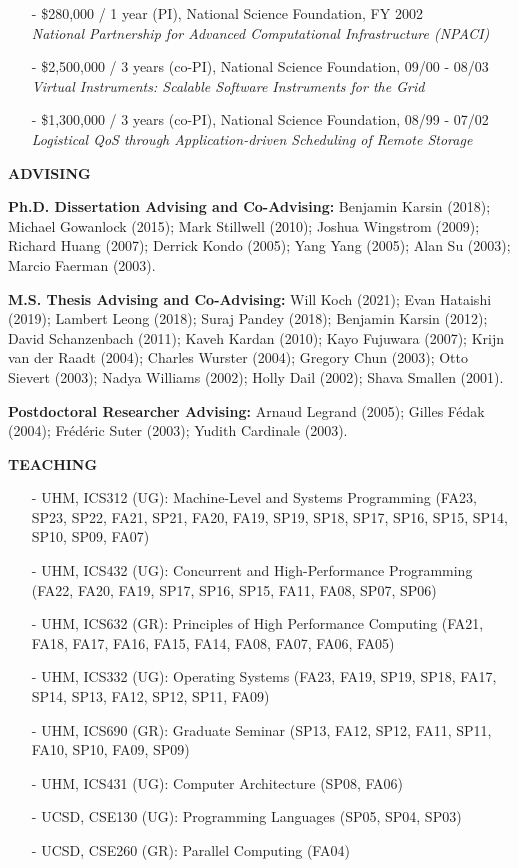 \documentclass[times,11pt]{letter}
\begin{document}
\begin{itemize}
\item[-] \$280,000 / 1 year (PI), National Science Foundation, FY 2002~\\
      \emph{National Partnership for Advanced Computational Infrastructure (NPACI)}

\item[-] \$2,500,000 / 3 years (co-PI), National Science Foundation, 09/00 - 08/03~\\
{\it Virtual Instruments: Scalable Software Instruments for the Grid}

\item[-] \$1,300,000 / 3 years (co-PI), National Science Foundation, 08/99 - 07/02~\\
{\it Logistical QoS through Application-driven Scheduling of Remote Storage}

\end{itemize}

\noindent
{\large{\bf ADVISING}}


\noindent
{\bf Ph.D. Dissertation Advising and Co-Advising:}
 Benjamin Karsin (2018); 
 Michael Gowanlock (2015);
 Mark Stillwell (2010); 
 Joshua Wingstrom (2009);
 Richard Huang (2007); 
 Derrick Kondo (2005);
 Yang Yang (2005);
 Alan Su (2003);
 Marcio Faerman (2003).

\noindent
{\bf M.S. Thesis Advising and Co-Advising:}
 Will Koch (2021);
 Evan Hataishi (2019);
 Lambert Leong (2018);
 Suraj Pandey (2018);
 Benjamin Karsin (2012);
 David Schanzenbach (2011);
 Kaveh Kardan (2010);
 Kayo Fujuwara (2007);
 Krijn van der Raadt (2004);
 Charles Wurster (2004);
 Gregory Chun (2003);
 Otto Sievert (2003);
 Nadya Williams (2002);
 Holly Dail (2002);
 Shava Smallen (2001).

\noindent
{\bf Postdoctoral Researcher Advising:}
 Arnaud Legrand (2005);
 Gilles F\'edak (2004);
 Fr\'ed\'eric Suter (2003);
 Yudith Cardinale (2003).


\noindent
{\large{\bf TEACHING}}


\begin{itemize}
\item [-] UHM, ICS312 (UG): Machine-Level and Systems Programming (FA23, SP23, SP22, FA21, SP21, FA20, FA19, SP19, SP18, SP17, SP16, SP15, SP14, SP10, SP09, FA07)
\item [-] UHM, ICS432 (UG): Concurrent and High-Performance Programming (FA22, FA20, FA19,  SP17, SP16, SP15, FA11, FA08, SP07, SP06)
\item [-] UHM, ICS632 (GR): Principles of High Performance Computing (FA21, FA18, FA17, FA16, FA15, FA14, FA08, FA07, FA06, FA05)
\item [-] UHM, ICS332 (UG): Operating Systems (FA23, FA19, SP19, SP18, FA17, SP14, SP13, FA12, SP12, SP11, FA09)
\item [-] UHM, ICS690 (GR): Graduate Seminar (SP13, FA12, SP12, FA11, SP11, FA10, SP10, FA09, SP09)
\item [-] UHM, ICS431 (UG): Computer Architecture (SP08, FA06)
\item [-] UCSD, CSE130 (UG): Programming Languages (SP05, SP04, SP03)
\item [-] UCSD, CSE260 (GR): Parallel Computing (FA04)
\end{itemize}
\end{document}
